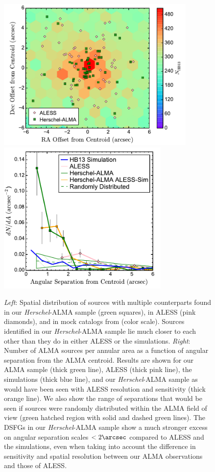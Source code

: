 \documentclass[iop]{emulateapj}
\begin{document}
\begin{figure}[!tbp] 
\includegraphics[height=3in]{../Figures/AllPositions.pdf}
\includegraphics[height=3in]{../Figures/dNdA.pdf}

\caption{ {\it Left}: Spatial distribution of sources with multiple
counterparts found in our {\it Herschel}-ALMA sample (green squares), in ALESS
(pink diamonds), and in mock catalogs from \citet{HB13} (color scale).  Sources
identified in our {\it Herschel}-ALMA sample lie much closer to each other than
they do in either ALESS or the \citet{HB13} simulations.  {\it Right}: Number
of ALMA sources per annular area as a function of angular separation from the
ALMA centroid.  Results are shown for our ALMA sample (thick green line), ALESS
(thick pink line), the \citet{HB13} simulations (thick blue line), and our {\it
Herschel}-ALMA sample as would have been seen with ALESS resolution and
sensitivity (thick orange line).  We also show the range of separations that
would be seen if sources were randomly distributed within the ALMA field of
view (green hatched region with solid and dashed green lines).  The DSFGs in
our {\it Herschel}-ALMA sample show a much stronger excess on angular
separation scales $<2\arcsec$ compared to ALESS and the \citet{HB13}
simulations, even when taking into account the difference in sensitivity and
spatial resolution between our ALMA observations and those of ALESS.  }
\label{fig:dNdA}

\end{figure}
\end{document}
